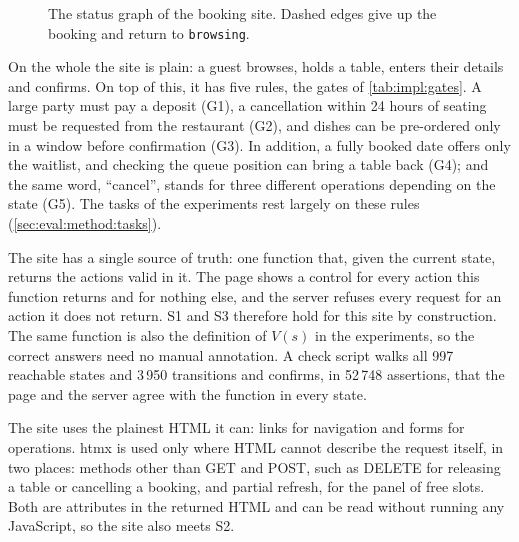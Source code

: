 \begin{figure}[htbp]
\centering
\resizebox{\textwidth}{!}{}
\caption{The status graph of the booking site. Dashed edges give up the booking and return to \texttt{browsing}.}
\label{fig:impl:states}
\end{figure}

On the whole the site is plain: a guest browses, holds a table, enters their details and confirms.
On top of this, it has five rules, the gates of \autoref{tab:impl:gates}.
A large party must pay a deposit (G1), a cancellation within 24 hours of seating must be requested from the restaurant (G2), and dishes can be pre-ordered only in a window before confirmation (G3).
In addition, a fully booked date offers only the waitlist, and checking the queue position can bring a table back (G4); and the same word, ``cancel'', stands for three different operations depending on the state (G5).
The tasks of the experiments rest largely on these rules (\autoref{sec:eval:method:tasks}).

\label{sec:impl:site:model}
The site has a single source of truth: one function that, given the current state, returns the actions valid in it.
The page shows a control for every action this function returns and for nothing else, and the server refuses every request for an action it does not return.
S1 and S3 therefore hold for this site by construction.
The same function is also the definition of $V(s)$ in the experiments, so the correct answers need no manual annotation.
A check script walks all 997 reachable states and 3\,950 transitions and confirms, in 52\,748 assertions, that the page and the server agree with the function in every state.

\label{sec:impl:site:vocab}
The site uses the plainest HTML it can: links for navigation and forms for operations.
htmx \cite{htmxlDocs} is used only where HTML cannot describe the request itself, in two places: methods other than GET and POST, such as DELETE for releasing a table or cancelling a booking, and partial refresh, for the panel of free slots.
Both are attributes in the returned HTML and can be read without running any JavaScript, so the site also meets S2.

